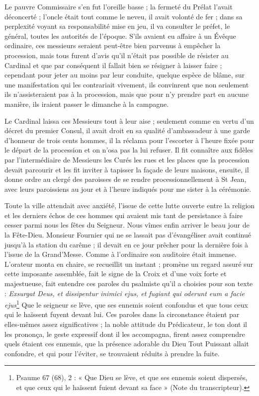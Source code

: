 \documentclass[11pt,a4paper]{report}
\begin{document}
Le pauvre Commissaire s'en fut l'oreille basse ; la fermeté du Prélat l'avait déconcerté ; l'oncle était tout comme le neveu, il avait volonté de fer ; dans sa perplexité voyant sa responsabilité mise en jeu, il va consulter le préfet, le général, toutes les autorités de l'époque. S'ils avaient eu affaire à un Évêque ordinaire, ces messieurs seraient peut-être bien parvenus à empêcher la procession, mais tous furent d'avis qu'il n'était pas possible de résister au Cardinal et que par conséquent il fallait bien se résigner à laisser faire ; cependant pour jeter au moins par leur conduite, quelque espèce de blâme, sur une manifestation qui les contrariait vivement, ils convinrent que non seulement ils n'assisteraient pas à la procession, mais que pour n'y prendre part en aucune manière, ils iraient passer le dimanche à la campagne.

Le Cardinal laissa ces Messieurs tout à leur aise ; seulement comme en vertu d'un décret du premier Consul, il avait droit en sa qualité d'ambassadeur à une garde d'honneur de trois cents hommes, il la réclama pour l'escorter à l'heure fixée pour le départ de la procession et on n'osa pas la lui refuser. Il fit connaître aux fidèles par l'intermédiaire de Messieurs les Curés les rues et les places que la procession devait parcourir et les fit inviter à tapisser la façade de leurs maisons, ensuite, il donne ordre au clergé des paroisses de se rendre processionnellement à St Jean, avec leurs paroissiens au jour et à l'heure indiqués pour me sister à la cérémonie.

Toute la ville attendait avec anxiété, l'issue de cette lutte ouverte entre la religion et les derniers échos de ces hommes qui avaient mis tant de persistance à faire cesser parmi nous les fêtes du Seigneur. Nous vîmes enfin arriver le beau jour de la Fête-Dieu. Monsieur Fournier qui ne se lassait pas d'évangéliser avait continué jusqu'à la station du carême ; il devait en ce jour prêcher pour la dernière fois à l'issue de la Grand'Messe. Comme à l'ordinaire son auditoire était immense. L'orateur monta en chaire, se recueillit un instant ; promène un regard assuré sur cette imposante assemblée, fait le signe de la Croix et d'une voix forte et majestueuse, fait entendre ces paroles du psalmiste qu'il a choisies pour son texte : \textit{Exsurgat Deus, et dissipentur inimici ejus, et fugiant qui oderunt eum a facie ejus}\footnote{Psaume 67 (68), 2 : « Que Dieu se lève, et que ses ennemis soient dispersés, et que ceux qui le haïssent fuient devant sa face » (Note du transcripteur).} Que le seigneur se lève, que ses ennemis soient confondus et que tous ceux qui le haïssent fuyent devant lui. Ces paroles dans la circonstance étaient par elles-mêmes assez significatives ; la noble attitude du Prédicateur, le ton dont il les prononça, le geste expressif dont il les accompagna, firent assez comprendre quels étaient ces ennemis, que la présence adorable du Dieu Tout Puissant allait confondre, et qui pour l'éviter, se trouvaient réduits à prendre la fuite.
\end{document}
